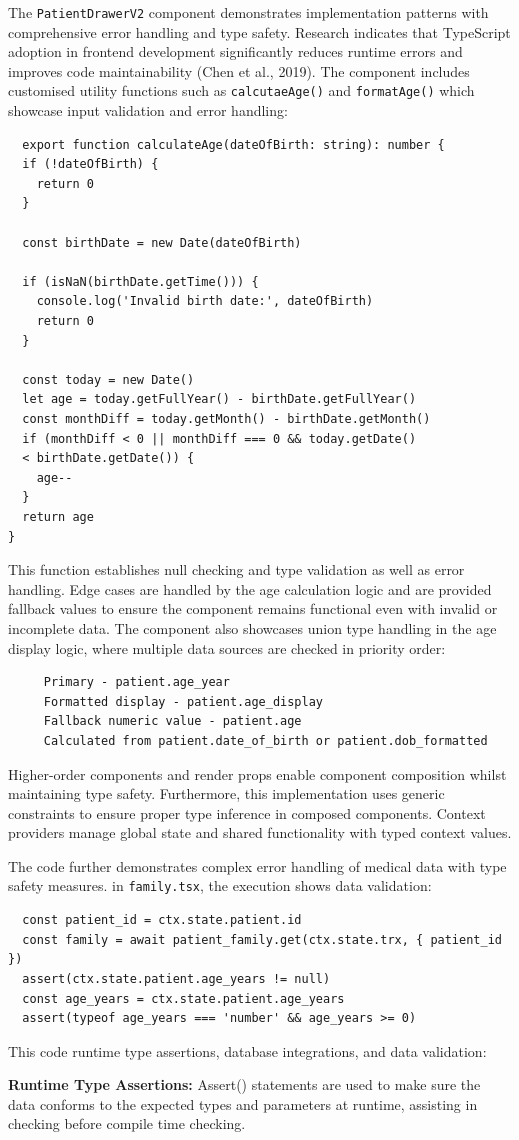 The \texttt{PatientDrawerV2} component demonstrates implementation patterns with comprehensive error handling and type safety. Research indicates that TypeScript adoption in frontend development significantly reduces runtime errors and improves code maintainability (Chen et al., 2019). The component includes customised utility functions such as \texttt{calcutaeAge()} and \texttt{formatAge()} which showcase input validation and error handling:
\begin{verbatim}
  export function calculateAge(dateOfBirth: string): number {
  if (!dateOfBirth) {
    return 0
  }

  const birthDate = new Date(dateOfBirth)

  if (isNaN(birthDate.getTime())) {
    console.log('Invalid birth date:', dateOfBirth)
    return 0
  }

  const today = new Date()
  let age = today.getFullYear() - birthDate.getFullYear()
  const monthDiff = today.getMonth() - birthDate.getMonth()
  if (monthDiff < 0 || monthDiff === 0 && today.getDate()
  < birthDate.getDate()) {
    age--
  }
  return age
}
\end{verbatim}
This function establishes null checking and type validation as well as error handling. Edge cases are handled by the age calculation logic and are provided fallback values to ensure the component remains functional even with invalid or incomplete data. The component also showcases union type handling in the age display logic, where multiple data sources are checked in priority order:
\begin{verbatim}
     Primary - patient.age_year
     Formatted display - patient.age_display
     Fallback numeric value - patient.age
   	 Calculated from patient.date_of_birth or patient.dob_formatted
\end{verbatim}
Higher-order components and render props enable component composition whilst maintaining type safety. Furthermore, this implementation uses generic constraints to ensure proper type inference in composed components. Context providers manage global state and shared functionality with typed context values.

The code further demonstrates complex error handling of medical data with type safety measures. in \texttt{family.tsx}, the execution shows data validation:
\begin{verbatim}
  const patient_id = ctx.state.patient.id
  const family = await patient_family.get(ctx.state.trx, { patient_id })
  assert(ctx.state.patient.age_years != null)
  const age_years = ctx.state.patient.age_years
  assert(typeof age_years === 'number' && age_years >= 0)
\end{verbatim}

This code runtime type assertions, database integrations, and data validation:

\textbf{Runtime Type Assertions:} Assert() statements are used to make sure the data conforms to the expected types and parameters at runtime, assisting in checking before compile time checking.